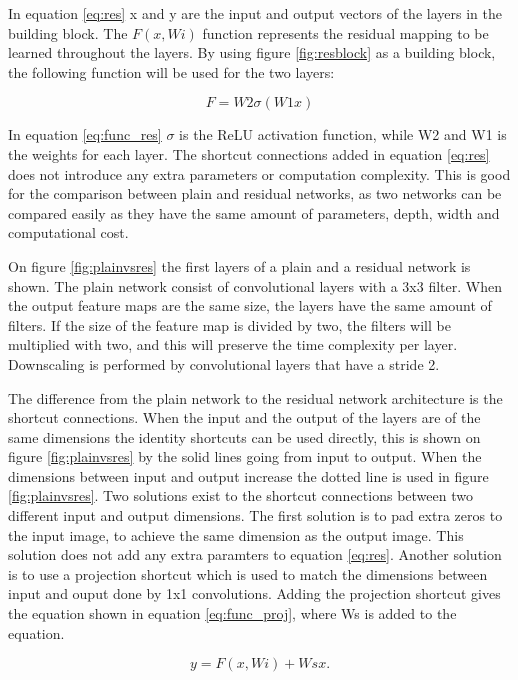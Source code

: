 In equation \ref{eq:res} x and y are the input and output vectors of the layers in the building block. The $F(x,{Wi})$ function represents the residual mapping to be learned throughout the layers. By using figure \ref{fig:resblock} as a building block, the following function will be used for the two layers: 

\begin{equation} \label{eq:func_res}
F = W2\sigma(W1x)
\end{equation} 

In equation \ref{eq:func_res} $\sigma$ is the ReLU activation function, while W2 and W1 is the weights for each layer. The shortcut connections added in equation \ref{eq:res} does not introduce any extra parameters or computation complexity. This is good for the comparison between plain and residual networks, as two networks can be compared easily as they have the same amount of parameters, depth, width and computational cost.
\newline

On figure \ref{fig:plainvsres} the first layers of a plain and a residual network is shown. The plain network consist of convolutional layers with a 3x3 filter. When the output feature maps are the same size, the layers have the same amount of filters. If the size of the feature map is divided by two, the filters will be multiplied with two, and this will preserve the time complexity per layer. Downscaling is performed by convolutional layers that have a stride 2.

\FloatBarrier

The difference from the plain network to the residual network architecture is the shortcut connections. When the input and the output of the layers are of the same dimensions the identity shortcuts can be used directly, this is shown on figure \ref{fig:plainvsres} by the solid lines going from input to output. When the dimensions between input and output increase the dotted line is used in figure \ref{fig:plainvsres}. Two solutions exist to the shortcut connections between two different input and output dimensions. The first solution is to pad extra zeros to the input image, to achieve the same dimension as the output image. This solution does not add any extra paramters to equation \ref{eq:res}. Another solution is to use a projection shortcut which is used to match the dimensions between input and ouput done by 1x1 convolutions. Adding the projection shortcut gives the equation shown in equation \ref{eq:func_proj}, where Ws is added to the equation.

\begin{equation} \label{eq:func_proj}
y = F(x, {Wi}) + Wsx.
\end{equation} 